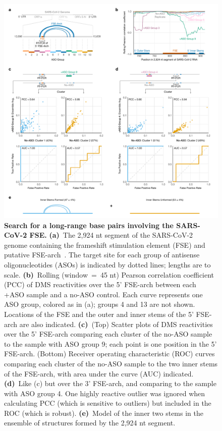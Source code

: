 \documentclass[main.tex]{subfiles}
\begin{document}
\begin{figure}[H]
	\includegraphics[width=\textwidth]{../MainFigures/sars2-tile/sars2-tile.pdf}
	\caption{\textbf{Search for a long-range base pairs involving the SARS-CoV-2 FSE.} \textbf{(a)}~The 2,924 nt segment of the SARS-CoV-2 genome containing the frameshift stimulation element (FSE) and putative FSE-arch~\cite{Ziv2020}. The target site for each group of antisense oligonucleotides (ASOs) is indicated by dotted lines; lengths are to scale. \textbf{(b)}~Rolling (window~=~45 nt) Pearson correlation coefficient (PCC) of DMS reactivities over the 5' FSE-arch between each +ASO sample and a no-ASO control. Each curve represents one ASO group, colored as in (a); groups 4 and 13 are not shown. Locations of the FSE and the outer and inner stems of the 5' FSE-arch are also indicated. \textbf{(c)}~(Top) Scatter plots of DMS reactivities over the 5' FSE-arch comparing each cluster of the no-ASO sample to the sample with ASO group 9; each point is one position in the 5' FSE-arch. (Bottom) Receiver operating characteristic (ROC) curves comparing each cluster of the no-ASO sample to the two inner stems of the FSE-arch, with area under the curve (AUC) indicated. \textbf{(d)}~Like (c) but over the 3' FSE-arch, and comparing to the sample with ASO group 4. One highly reactive outlier was ignored when calculating PCC (which is sensitive to outliers) but included in the ROC (which is robust). \textbf{(e)}~Model of the inner two stems in the ensemble of structures formed by the 2,924 nt segment.}
	\label{tiles}
\end{figure}
\end{document}
